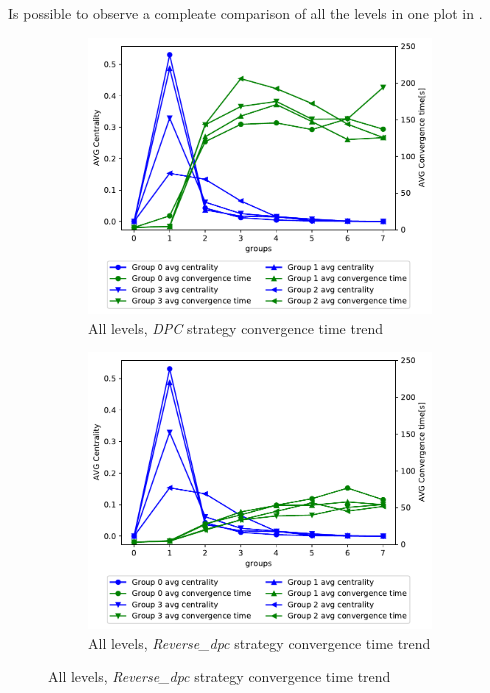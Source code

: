 \documentclass[10pt,conference,letterpaper]{IEEEtran}
\newcommand{\figwidth}{0.78}
\begin{document}
Is possible to observe a compleate comparison of all the levels in one plot
in .

\begin{figure}[tb]
	\centering

	\begin{subfigure}{.49\columnwidth}
		\centering
		\includegraphics[width=\figwidth\columnwidth]{images/different_levels/DPC_all_levels_comparison_centVStime.pdf}
		\caption{All levels, \textit{DPC} strategy convergence time trend}
		\label{fig:1000-dpc-time-trend-allLevels}
	\end{subfigure}
	\hfill
	\begin{subfigure}{.49\columnwidth}
		\centering
		\includegraphics[width=\figwidth\columnwidth]{images/different_levels/reverse_dpc_all_levels_comparison_centVStime.pdf}
		\caption{All levels, \textit{Reverse\_dpc} strategy convergence time trend}
		\label{fig:1000-reverse-reverse_dpc-time-trend-allLevels}
	\end{subfigure}


\end{figure}
\end{document}
